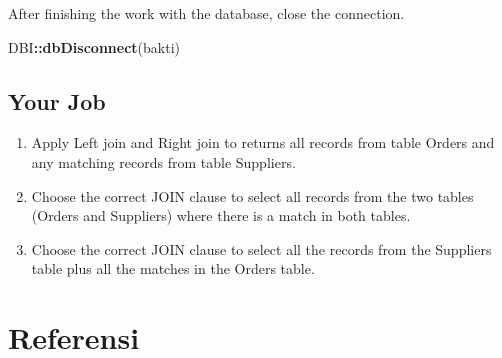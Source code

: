 \documentclass[
]{book}
\newenvironment{Shaded}{\begin{snugshade}}{\end{snugshade}}
\newcommand{\FunctionTok}[1]{\textcolor[rgb]{0.13,0.29,0.53}{\textbf{#1}}}
\newcommand{\NormalTok}[1]{#1}
\newcommand{\SpecialCharTok}[1]{\textcolor[rgb]{0.81,0.36,0.00}{\textbf{#1}}}
\begin{document}
After finishing the work with the database, close the connection.

\begin{Shaded}
\begin{Highlighting}[]
\NormalTok{DBI}\SpecialCharTok{::}\FunctionTok{dbDisconnect}\NormalTok{(bakti)}
\end{Highlighting}
\end{Shaded}

\hypertarget{your-job-2}{%
\section{Your Job}\label{your-job-2}}

\begin{enumerate}
\def\labelenumi{\arabic{enumi}.}
\item
  Apply Left join and Right join to returns all records from table Orders and any matching records from table Suppliers.
\item
  Choose the correct JOIN clause to select all records from the two tables (Orders and Suppliers) where there is a match in both tables.
\item
  Choose the correct JOIN clause to select all the records from the Suppliers table plus all the matches in the Orders table.
\end{enumerate}

\hypertarget{referensi}{%
\chapter{Referensi}\label{referensi}}

  
\end{document}
